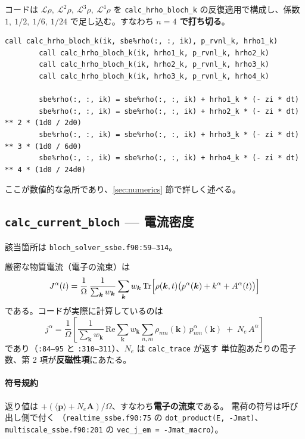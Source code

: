 \documentclass[dvipdfmx,a4paper,11pt]{jsarticle}
\newcommand{\file}[1]{\texttt{#1}}
\newcommand{\vk}{\bm{k}}
\newcommand{\vA}{\bm{A}}
\newcommand{\vp}{\bm{p}}
\newcommand{\Tr}{\mathrm{Tr}}
\newcommand{\Real}{\mathrm{Re}}
\begin{document}
コードは $\mathcal{L}\rho,\ \mathcal{L}^2\rho,\ \mathcal{L}^3\rho,\ \mathcal{L}^4\rho$ を
\verb|calc_hrho_bloch_k| の反復適用で構成し、係数
$1,\ 1/2,\ 1/6,\ 1/24$ で足し込む。すなわち\textbf{ $n=4$ で打ち切る}。

\begin{lstlisting}[firstnumber=343,caption={テイラー級数の構成と加算}]
        call calc_hrho_bloch_k(ik, sbe%rho(:, :, ik), p_rvnl_k, hrho1_k)
        call calc_hrho_bloch_k(ik, hrho1_k, p_rvnl_k, hrho2_k)
        call calc_hrho_bloch_k(ik, hrho2_k, p_rvnl_k, hrho3_k)
        call calc_hrho_bloch_k(ik, hrho3_k, p_rvnl_k, hrho4_k)

        sbe%rho(:, :, ik) = sbe%rho(:, :, ik) + hrho1_k * (- zi * dt)
        sbe%rho(:, :, ik) = sbe%rho(:, :, ik) + hrho2_k * (- zi * dt) ** 2 * (1d0 / 2d0)
        sbe%rho(:, :, ik) = sbe%rho(:, :, ik) + hrho3_k * (- zi * dt) ** 3 * (1d0 / 6d0)
        sbe%rho(:, :, ik) = sbe%rho(:, :, ik) + hrho4_k * (- zi * dt) ** 4 * (1d0 / 24d0)
\end{lstlisting}

ここが数値的な急所であり、\ref{sec:numerics} 節で詳しく述べる。

\subsection{\texttt{calc\_current\_bloch} --- 電流密度}
\label{sec:current}

該当箇所は \file{bloch\_solver\_ssbe.f90:59--314}。

厳密な物質電流（電子の流束）は
%
\begin{equation}
  J^\alpha(t)
  = \frac{1}{\Omega}\,\frac{1}{\sum_{\vk} w_{\vk}}
    \sum_{\vk} w_{\vk}\,
    \Tr\Bigl[\rho(\vk,t)\bigl(p^\alpha(\vk) + k^\alpha + A^\alpha(t)\bigr)\Bigr]
  \label{eq:jexact}
\end{equation}
%
である。コードが実際に計算しているのは
%
\begin{equation}
  j^\alpha
  = \frac{1}{\Omega}\left[
      \frac{1}{\sum_{\vk} w_{\vk}}\,
      \Real \sum_{\vk} w_{\vk} \sum_{n,m} \rho_{mn}(\vk)\, p^\alpha_{nm}(\vk)
      \;+\; N_e\, A^\alpha
    \right]
  \label{eq:jcode}
\end{equation}
%
であり（\file{:84--95} と \file{:310--311}）、$N_e$ は \verb|calc_trace| が返す
単位胞あたりの電子数、第 2 項が\textbf{反磁性項}にあたる。

\paragraph{符号規約}
返り値は $+(\langle \vp\rangle + N_e \vA)/\Omega$、すなわち\textbf{電子の流束}である。
電荷の符号は呼び出し側で付く
（\file{realtime\_ssbe.f90:75} の \verb|dot_product(E, -Jmat)|、
 \file{multiscale\_ssbe.f90:201} の \verb|vec_j_em = -Jmat_macro|）。
\end{document}
